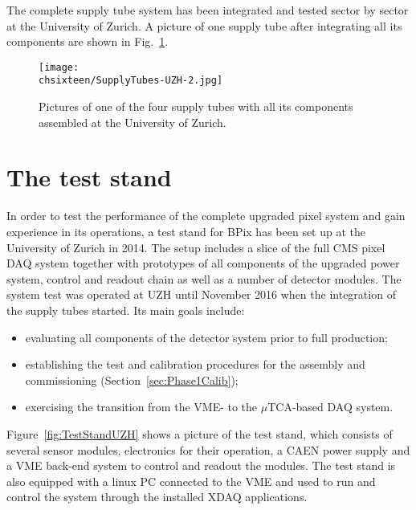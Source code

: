 The complete supply tube system has been integrated and tested sector by sector at the University of Zurich. A picture of one supply tube after integrating all its components are shown in Fig.~\ref{fig:SCuzh}.
\begin{figure}[!htb]
 \begin{center}
  \texttt{[image: \\chsixteen/SupplyTubes-UZH-2.jpg]}
 \end{center}
 \caption{Pictures of one of the four supply tubes with all its components assembled at the University of Zurich.}
 \label{fig:SCuzh}
\end{figure}

\section{The test stand}

In order to test the performance of the complete upgraded pixel system and gain experience in its operations, a test stand for BPix has been set up at the University of Zurich in 2014.
The setup includes a slice of the full CMS pixel DAQ system together with prototypes of all components of the upgraded power system, control and readout chain as well as a number of detector modules.
The system test was operated at UZH until November 2016 when the integration of the supply tubes started.
Its main goals include:
\begin{itemize}
\item evaluating all components of the detector system prior to full production;
\item establishing the test and calibration procedures for the assembly and commissioning (Section~\ref{sec:Phase1Calib});
\item exercising the transition from the VME- to the $\mu$TCA-based DAQ system.
\end{itemize}

Figure~\ref{fig:TestStandUZH} shows a picture of the test stand,
which consists of several sensor modules, electronics for their operation, a CAEN power supply and a VME back-end system to control and readout the modules.
The test stand is also equipped with a linux PC connected to the VME and used to run and control the system through the installed XDAQ applications.

